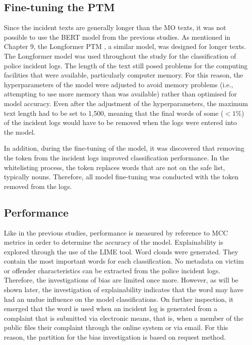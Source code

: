 \subsection{Fine-tuning the PTM} Since the incident texts are generally longer than the MO texts, it was not possible to use the BERT model from the previous studies. As mentioned in Chapter 9, the Longformer PTM \parencite{beltagy2020longformer}, a similar model, was designed for longer texts. The Longformer model was used throughout the study for the classification of police incident logs. The length of the text still posed problems for the computing facilities that were available, particularly computer memory. For this reason, the hyperparameters of the model were adjusted to avoid memory problems (i.e., attempting to use more memory than was available) rather than optimised for model accuracy. Even after the adjustment of the hyperparameters, the maximum text length had to be set to 1,500, meaning that the final words of some ($<1\%$) of the incident logs would have to be removed when the logs were entered into the model.

In addition, during the fine-tuning of the model, it was discovered that removing the  token from the incident logs improved classification performance. In the whitelisting process, the   token replaces words that are not on the safe list, typically nouns. Therefore, all model fine-tuning was conducted with the   token removed from the logs.

\subsection{Performance} Like in the previous studies, performance is measured by reference to MCC metrics in order to determine the accuracy of the model. Explainability is explored through the use of the LIME tool. Word clouds were generated. They contain the most important words for each classification.
No metadata on victim or offender characteristics can be extracted from the police incident logs. Therefore, the investigations of bias are limited once more. However, as will be shown later, the investigation of explainability indicates that the word  may have had an undue influence on the model classifications. On further inspection, it emerged that the word  is used when an incident log is generated from a complaint that is submitted via electronic means, that is, when a member of the public files their complaint through the online system or via email. For this reason, the partition for the bias investigation is based on request method.

